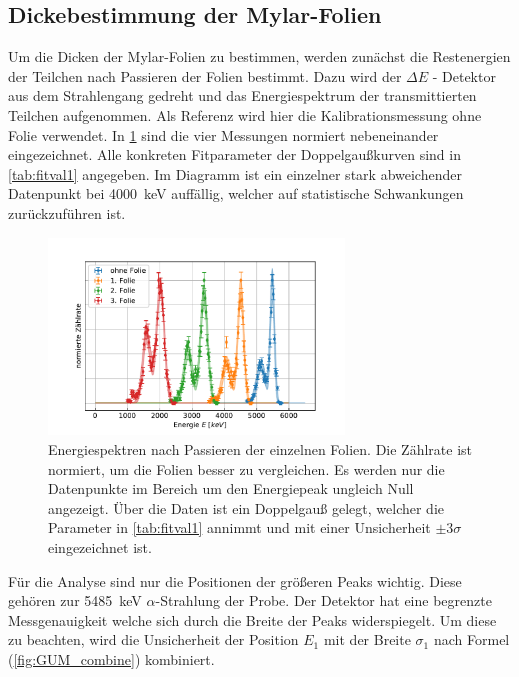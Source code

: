 \subsection{Dickebestimmung der Mylar-Folien}
\label{sec:dicke}

Um die Dicken der Mylar-Folien zu bestimmen, werden zunächst die Restenergien der Teilchen nach Passieren der Folien bestimmt.
Dazu wird der $\Delta E$ - Detektor aus dem Strahlengang gedreht und das Energiespektrum der transmittierten Teilchen aufgenommen.
Als Referenz wird hier die Kalibrationsmessung ohne Folie verwendet.
In \cref{fig:foliendicke} sind die vier Messungen normiert nebeneinander eingezeichnet.
Alle konkreten Fitparameter der Doppelgaußkurven sind in \cref{tab:fitval1} angegeben.
Im Diagramm ist ein einzelner stark abweichender Datenpunkt bei \SI{4000}{\kilo\electronvolt} auffällig, welcher auf statistische Schwankungen zurückzuführen ist.

\begin{figure}[ht]
	\centering
	\includegraphics[width=0.7\textwidth]{dat/m3_foliendicke.pdf}
	\caption{Energiespektren nach Passieren der einzelnen Folien.
			Die Zählrate ist normiert, um die Folien besser zu vergleichen.
			Es werden nur die Datenpunkte im Bereich um den Energiepeak ungleich Null angezeigt.
			Über die Daten ist ein Doppelgauß gelegt, welcher die Parameter in \cref{tab:fitval1} annimmt und mit einer Unsicherheit $\pm 3 \sigma$ eingezeichnet ist.}
	\label{fig:foliendicke}
\end{figure}

Für die Analyse sind nur die Positionen der größeren Peaks wichtig.
Diese gehören zur \SI{5485}{\kilo\electronvolt} $\alpha$-Strahlung der Probe.
Der Detektor hat eine begrenzte Messgenauigkeit welche sich durch die Breite der Peaks widerspiegelt.
Um diese zu beachten, wird die Unsicherheit der Position $E_1$ mit der Breite $\sigma_1$ nach Formel (\ref{fig:GUM_combine}) kombiniert.

